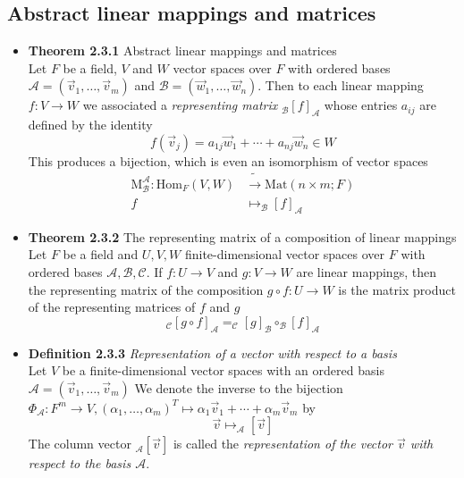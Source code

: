 \documentclass[11pt,a4paper]{article}
\begin{document}
\subsection{Abstract linear mappings and matrices}

\begin{itemize}

    \item \textbf{Theorem 2.3.1} Abstract linear mappings and matrices \\
        Let $F$ be a field, $V$ and $W$ vector spaces over $F$ with ordered bases
        $\mathcal{A} = (\vec{v}_1, \ldots, \vec{v}_m)$ and
        $\mathcal{B} = (\vec{w}_1, \ldots, \vec{w}_n)$.
        Then to each linear mapping $f : V \to W$ we associated a \emph{representing matrix}
        $_\mathcal{B}{[f]}_\mathcal{A}$ whose entries $a_{ij}$ are defined by the identity
        \[
            f(\vec{v}_j) = a_{1j}\vec{w}_1 + \cdots + a_{nj}\vec{w}_n \in W
        \]
        This produces a bijection, which is even an isomorphism of vector spaces
        \begin{align*}{}
            \mathrm{M}_\mathcal{B}^\mathcal{A} : \mathrm{Hom}_F(V,W) & \tilde{\to}
            \mathrm{Mat}(n \times m; F) \\
            f &\mapsto _\mathcal{B}{[f]}_\mathcal{A}
        \end{align*}

    \item \textbf{Theorem 2.3.2} The representing matrix of a composition of linear
        mappings \\
        Let $F$ be a field and $U, V, W$ finite-dimensional vector spaces over $F$ with
        ordered bases $\mathcal{A, B, C}$.
        If $f : U \to V$ and $g : V \to W$ are linear mappings,
        then the representing  matrix of the composition
        $g \circ f : U \to W$
        is the matrix product of the representing matrices of $f$ and $g$
        \[
            _\mathcal{C}{[g \circ f]}_\mathcal{A} = _\mathcal{C}{[g]}_\mathcal{B} \circ
            _\mathcal{B}{[f]}_\mathcal{A}
        \]

    \item \textbf{Definition 2.3.3} \emph{Representation of a vector with respect to a
        basis} \\
        Let $V$ be a finite-dimensional vector spaces with an ordered basis
        $\mathcal{A} = (\vec{v}_1, \ldots, \vec{v}_m)$
        We denote the inverse to the bijection
        $\Phi_\mathcal{A} : F^m \to V, {(\alpha_1, \ldots, \alpha_m)}^T \mapsto
        \alpha_1\vec{v}_1 + \cdots + \alpha_m\vec{v}_m$ by
        \[
            \vec{v} \mapsto _\mathcal{A}[\vec{v}]
        \]
        The column vector $_\mathcal{A}[\vec{v}]$ is called the \emph{representation of the
        vector $\vec{v}$ with respect to the basis $\mathcal{A}$}.


\end{itemize}
\end{document}
